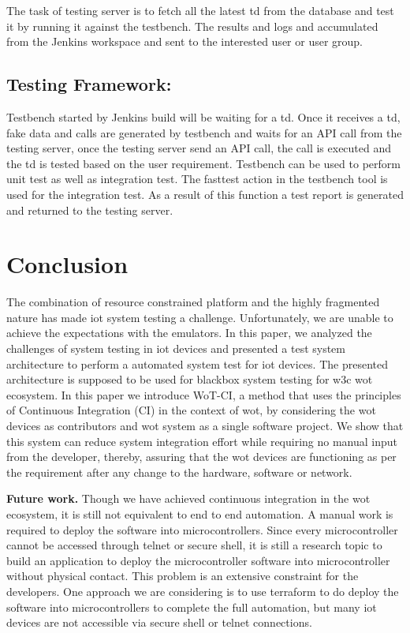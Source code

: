 \documentclass[conference]{IEEEtran}
\theoremstyle{definition}
\begin{document}
The task of testing server is to fetch all the latest \ac{td} from the database and test it by running it against the testbench.
The results and logs and accumulated from the Jenkins workspace and sent to the interested user or user group.

\subsection{Testing Framework:}

Testbench started by Jenkins build will be waiting for a \ac{td}. 
Once it receives a \ac{td}, fake data and calls are generated by testbench and waits for an API call from the testing server, once the testing server send an API call, the call is executed and the \ac{td} is tested based on the user requirement.
Testbench can be used to perform unit test as well as integration test. 
The fasttest action in the testbench tool is used for the integration test. 
As a result of this function a test report is generated and returned to the testing server.

\section{Conclusion}

The combination of resource constrained platform and the highly fragmented nature has made \ac{iot} system testing a challenge.
Unfortunately, we are unable to achieve the expectations with the emulators.
In this paper, we analyzed the challenges of system testing in \ac{iot} devices and presented a test system architecture to perform a automated system test for \ac{iot} devices.
The presented architecture is supposed to be used for blackbox system testing for \ac{w3c} \ac{wot} ecosystem. 
In this paper we introduce WoT-CI, a method that uses the principles of Continuous Integration (CI) in the context of \ac{wot}, by considering the \ac{wot} devices as contributors and \ac{wot} system as a single software project. We show that this system can reduce system integration effort while requiring no manual input from the developer, thereby, assuring that the \ac{wot} devices are functioning as per the requirement after any change to the hardware, software or network.

\textbf{Future work.} Though we have achieved continuous integration in the \ac{wot} ecosystem, it is still not equivalent to end to end automation.
A manual work is required to deploy the software into microcontrollers. 
Since every microcontroller cannot be accessed through telnet or secure shell, it is still a research topic to build an application to deploy the microcontroller software into microcontroller without physical contact.  
This problem is an extensive constraint for the developers.
One approach we are considering is to use terraform to do deploy the software into microcontrollers to complete the full automation, but many \ac{iot} devices are not accessible via secure shell or telnet connections.  
\end{document}
